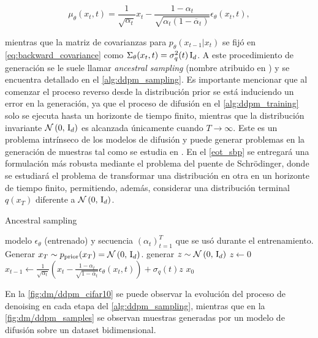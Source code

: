 \begin{equation*}
    \mu_\theta(x_t,t) = \frac{1}{\sqrt{\alpha_t}}x_t - \frac{1-\alpha_t}{\sqrt{\alpha_t(1-\overline{\alpha}_t)}}\epsilon_\theta(x_t,t),
\end{equation*}

mientras que la matriz de covarianzas para $p_\theta(x_{t-1}|x_t)$ se fijó en \eqref{eq:backward_covariance} como $\Sigma_\theta(x_t,t)=\sigma_q^2(t)\operatorname{I}_{d}$. A este procedimiento de generación se le suele llamar \textit{ancestral sampling} (nombre atribuido en \cite{song2021scorebased}) y se encuentra detallado en el \autoref{alg:ddpm_sampling}. Es importante mencionar que al comenzar el proceso reverso desde la distribución prior se está induciendo un error en la generación, ya que el proceso de difusión en el \autoref{alg:ddpm_training} solo se ejecuta hasta un horizonte de tiempo finito, mientras que la distribución invariante $\mathcal{N}\left(0,\,\operatorname{I}_{d}\right)$ es alcanzada únicamente cuando $T\to\infty$. Este es un problema intrínseco de los modelos de difusión y puede generar problemas en la generación de muestras tal como se estudia en \cite{debortoli2023diffusion}. En el \autoref{eot_sbp} se entregará una formulación más robusta mediante el problema del puente de Schrödinger, donde se estudiará el problema de transformar una distribución en otra en un horizonte de tiempo finito, permitiendo, además, considerar una distribución terminal $q(x_T)$ diferente a $\mathcal{N}\left(0,\,\operatorname{I}_{d}\right)$.

\begin{algorithm}
    \caption{Ancestral sampling}
    \label{alg:ddpm_sampling}
    \begin{algorithmic}[1]
        \Require modelo $\epsilon_\theta$ (entrenado) y secuencia $(\alpha_t)_{t=1}^T$ que se usó durante el entrenamiento.
        \State Generar $x_T\sim p_{\operatorname{prior}}(x_T)=\mathcal{N}\left(0,\,\operatorname{I}_{d}\right)$.
        \State generar $z\sim\mathcal{N}\left(0,\,\operatorname{I}_{d}\right)$
        \Else
        \State $z \gets 0$
        \EndIf
        \State $x_{t-1} \gets \frac{1}{\sqrt{\alpha_t}}\left(x_t-\frac{1-\alpha_t}{\sqrt{1-\overline{\alpha}_t}}\epsilon_\theta(x_t,t)\right) + \sigma_q(t) z$
        \EndFor
        \State \Return $x_0$
    \end{algorithmic}
\end{algorithm}

En la \autoref{fig:dm/ddpm_cifar10} se puede observar la evolución del proceso de denoising en cada etapa del \autoref{alg:ddpm_sampling}, mientras que en la \autoref{fig:dm/ddpm_samples} se observan muestras generadas por un modelo de difusión sobre un dataset bidimensional.

